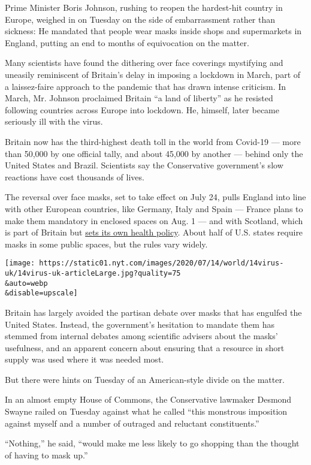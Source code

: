 Prime Minister Boris Johnson, rushing to reopen the hardest-hit country
in Europe, weighed in on Tuesday on the side of embarrassment rather
than sickness: He mandated that people wear masks inside shops and
supermarkets in England, putting an end to months of equivocation on the
matter.

Many scientists have found the dithering over face coverings mystifying
and uneasily reminiscent of Britain's delay in imposing a lockdown in
March, part of a laissez-faire approach to the pandemic that has drawn
intense criticism. In March, Mr. Johnson proclaimed Britain ``a land of
liberty'' as he resisted following countries across Europe into
lockdown. He, himself, later became seriously ill with the virus.

Britain now has the third-highest death toll in the world from Covid-19
--- more than 50,000 by one official tally, and about 45,000 by another
--- behind only the United States and Brazil. Scientists say the
Conservative government's slow reactions have cost thousands of lives.

The reversal over face masks, set to take effect on July 24, pulls
England into line with other European countries, like Germany, Italy and
Spain --- France plans to make them mandatory in enclosed spaces on Aug.
1 --- and with Scotland, which is part of Britain but
\href{https://www.nytimes.com/2020/07/10/world/europe/coroanvirus-scotland-england.html}{sets
its own health policy}. About half of U.S. states require masks in some
public spaces, but the rules vary widely.

\texttt{[image: https://static01.nyt.com/images/2020/07/14/world/14virus-uk/14virus-uk-articleLarge.jpg?quality=75\\\&auto=webp\\\&disable=upscale]}

Britain has largely avoided the partisan debate over masks that has
engulfed the United States. Instead, the government's hesitation to
mandate them has stemmed from internal debates among scientific advisers
about the masks' usefulness, and an apparent concern about ensuring that
a resource in short supply was used where it was needed most.

But there were hints on Tuesday of an American-style divide on the
matter.

In an almost empty House of Commons, the Conservative lawmaker Desmond
Swayne railed on Tuesday against what he called ``this monstrous
imposition against myself and a number of outraged and reluctant
constituents.''

``Nothing,'' he said, ``would make me less likely to go shopping than
the thought of having to mask up.''

